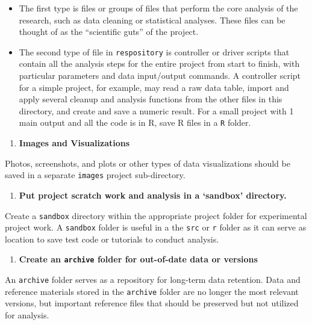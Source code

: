 \documentclass[
]{book}
\providecommand{\tightlist}{%
  \setlength{\itemsep}{0pt}\setlength{\parskip}{0pt}}
\begin{document}
\begin{itemize}
\tightlist
\item
  The first type is files or groups of files that perform the core analysis of the research, such as data cleaning or statistical analyses. These files can be thought of as the ``scientific guts'' of the project.
\item
  The second type of file in \texttt{respository} is controller or driver scripts that contain all the analysis steps for the entire project from start to finish, with particular parameters and data input/output commands. A controller script for a simple project, for example, may read a raw data table, import and apply several cleanup and analysis functions from the other files in this directory, and create and save a numeric result. For a small project with 1 main output and all the code is in R, save R files in a \texttt{R} folder.
\end{itemize}

\begin{enumerate}
\def\labelenumi{\arabic{enumi}.}
\setcounter{enumi}{4}
\tightlist
\item
  \textbf{Images and Visualizations}
\end{enumerate}

Photos, screenshots, and plots or other types of data visualizations should be saved in a separate \texttt{images} project sub-directory.

\begin{enumerate}
\def\labelenumi{\arabic{enumi}.}
\setcounter{enumi}{5}
\tightlist
\item
  \textbf{Put project scratch work and analysis in a `sandbox' directory.}
\end{enumerate}

Create a \texttt{sandbox} directory within the appropriate project folder for experimental project work. A \texttt{sandbox} folder is useful in a the \texttt{src} or \texttt{r} folder as it can serve as location to save test code or tutorials to conduct analysis.

\begin{enumerate}
\def\labelenumi{\arabic{enumi}.}
\setcounter{enumi}{6}
\tightlist
\item
  \textbf{Create an \texttt{archive} folder for out-of-date data or versions}
\end{enumerate}

An \texttt{archive} folder serves as a repository for long-term data retention. Data and reference materials stored in the \texttt{archive} folder are no longer the most relevant versions, but important reference files that should be preserved but not utilized for analysis.
\end{document}
